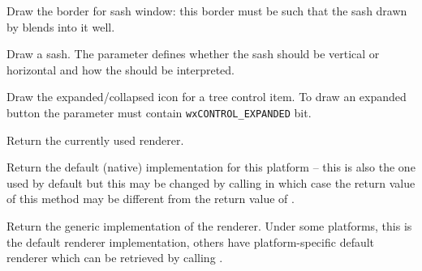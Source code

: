 
Draw the border for sash window: this border must be such that the sash
drawn by  blends into it
well.


\label{wxrenderernativedrawsplittersash}


Draw a sash. The  parameter defines whether the sash should be
vertical or horizontal and how the  should be interpreted.


\label{wxrenderernativedrawtreeitembutton}


Draw the expanded/collapsed icon for a tree control item. To draw an expanded
button the  parameter must contain {\tt wxCONTROL\_EXPANDED} bit.


\label{wxrenderernativeget}


Return the currently used renderer.


\label{wxrenderernativegetdefault}


Return the default (native) implementation for this platform -- this is also
the one used by default but this may be changed by calling 
 in which case the return value of this
method may be different from the return value of .


\label{wxrenderernativegetgeneric}


Return the generic implementation of the renderer. Under some platforms, this
is the default renderer implementation, others have platform-specific default
renderer which can be retrieved by calling .


